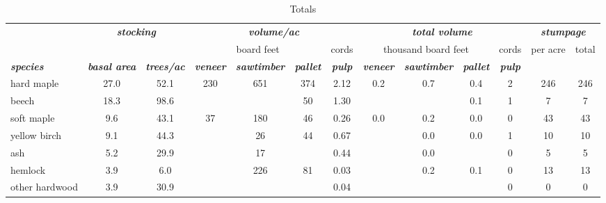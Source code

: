 \documentclass[landscape]{article}
\begin{document}
\begin{table}[H]

\caption{\label{tab:unnamed-chunk-51}Totals}
\fontsize{10}{12}\selectfont
\begin{tabular}[t]{lcccccccccccc}
\toprule
\multicolumn{1}{c}{\em{\textbf{ }}} & \multicolumn{2}{c}{\em{\textbf{stocking}}} & \multicolumn{4}{c}{\em{\textbf{volume/ac }}} & \multicolumn{4}{c}{\em{\textbf{total volume}}} & \multicolumn{2}{c}{\em{\textbf{stumpage}}} \\
\cmidrule(l{3pt}r{3pt}){2-3} \cmidrule(l{3pt}r{3pt}){4-7} \cmidrule(l{3pt}r{3pt}){8-11} \cmidrule(l{3pt}r{3pt}){12-13}
\multicolumn{3}{c}{ } & \multicolumn{3}{c}{board feet} & \multicolumn{1}{c}{cords} & \multicolumn{3}{c}{thousand board feet} & \multicolumn{1}{c}{cords} & \multicolumn{1}{c}{per acre} & \multicolumn{1}{c}{total} \\
\cmidrule(l{3pt}r{3pt}){4-6} \cmidrule(l{3pt}r{3pt}){7-7} \cmidrule(l{3pt}r{3pt}){8-10} \cmidrule(l{3pt}r{3pt}){11-11} \cmidrule(l{3pt}r{3pt}){12-12} \cmidrule(l{3pt}r{3pt}){13-13}
\rowcolor[HTML]{DCDCDC}  \em{\textbf{species}} & \em{\textbf{basal area}} & \em{\textbf{trees/ac}} & \em{\textbf{veneer}} & \em{\textbf{sawtimber}} & \em{\textbf{pallet}} & \em{\textbf{pulp}} & \em{\textbf{veneer}} & \em{\textbf{sawtimber}} & \em{\textbf{pallet}} & \em{\textbf{pulp}} & \em{\textbf{ }} & \em{\textbf{ }}\\
\midrule
\rowcolor{gray!6}  hard maple & 27.0 & 52.1 & 230 & 651 & 374 & 2.12 & 0.2 & 0.7 & 0.4 & 2 & 246 & 246\\
 
beech & 18.3 & 98.6 &  &  & 50 & 1.30 &  &  & 0.1 & 1 & 7 & 7\\
 
\rowcolor{gray!6}  soft maple & 9.6 & 43.1 & 37 & 180 & 46 & 0.26 & 0.0 & 0.2 & 0.0 & 0 & 43 & 43\\
 
yellow birch & 9.1 & 44.3 &  & 26 & 44 & 0.67 &  & 0.0 & 0.0 & 1 & 10 & 10\\
 
\rowcolor{gray!6}  ash & 5.2 & 29.9 &  & 17 &  & 0.44 &  & 0.0 &  & 0 & 5 & 5\\
 
hemlock & 3.9 & 6.0 &  & 226 & 81 & 0.03 &  & 0.2 & 0.1 & 0 & 13 & 13\\
 
\rowcolor{gray!6}  other hardwood & 3.9 & 30.9 &  &  &  & 0.04 &  &  &  & 0 & 0 & 0\\
 

\end{tabular}
\end{table}
\end{document}
